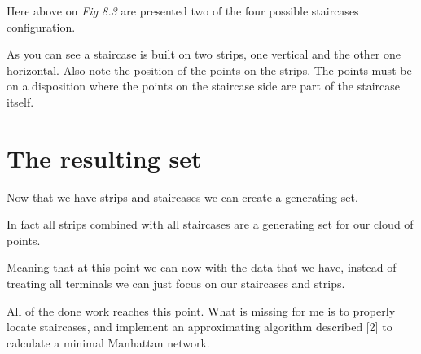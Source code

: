 Here above on \emph{Fig 8.3} are presented two of the four possible staircases configuration.

As you can see a staircase is built on two strips, one vertical and the other one horizontal. Also note the position of the points on the strips. The points must be on a disposition where the points on the staircase side are part of the staircase itself.
\section{The resulting set}%
Now that we have strips and staircases we can create a generating set.

In fact all strips combined with all staircases are a generating set for our cloud of points.

Meaning that at this point we can now with the data that we have, instead of treating all terminals we can just focus on our staircases and strips.\newline

All of the done work reaches this point. What is missing for me is to properly locate staircases, and implement an approximating algorithm described [2] to calculate a minimal Manhattan network. 
